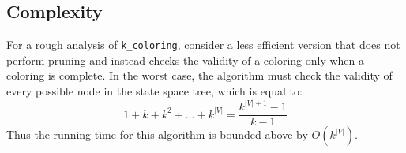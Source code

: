 \documentclass{article}
\begin{document}






 



\subsection{Complexity}






For a rough analysis of \texttt{k\_coloring}, consider a less efficient version that does not perform pruning and instead checks the validity of a coloring only when a coloring
is complete. In the worst case, the algorithm must check the validity of every possible node in the state space tree, which is equal to:
\begin{equation}
1 + k + k^2 + \dots + k^{|V|} = \frac{k^{|V|+1}-1}{k-1}
\end{equation}
Thus the running time for this algorithm is bounded above by $O(k^{|V|})$. 
\end{document}

